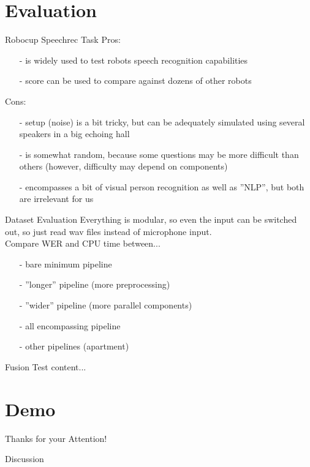 \documentclass{beamer}
\begin{document}
	
	
	
	
	
	
	
	
	\section{Evaluation}
	
	\begin{frame}{Robocup Speechrec Task}
		\pause
		Pros:
		\begin{itemize}
			\item[-] is widely used to test robots speech recognition capabilities
			\item[-] score can be used to compare against dozens of other robots
		\end{itemize}
		\pause
		Cons:
		\begin{itemize}
			\item[-] setup (noise) is a bit tricky, but can be adequately simulated using several speakers in a big echoing hall
			\item[-] is somewhat random, because some questions may be more difficult than others (however, difficulty may depend on components)
			\item[-] encompasses a bit of visual person recognition as well as ''NLP'', but both are irrelevant for us
		\end{itemize}
	\end{frame}
	
	\begin{frame}{Dataset Evaluation}
		Everything is modular, so even the input can be switched out, so just read wav files instead of microphone input.\\

		Compare WER and CPU time between...
		\begin{itemize}
			\item[-] bare minimum pipeline
			\item[-] ''longer'' pipeline (more preprocessing)
			\item[-] ''wider'' pipeline (more parallel components)
			\item[-] all encompassing pipeline
			\item[-] other pipelines (apartment)
		\end{itemize}
	\end{frame}
	
	\begin{frame}{Fusion Test}
		content...
	\end{frame}
	
	
	
	
	
	\section{Demo}
	
	
	
	
	
	\begin{frame}{}
		\begin{alertblock}{Thanks for your Attention!}
		\end{alertblock}
	\end{frame}
	
	\begin{frame}{}
		\begin{alertblock}{Discussion}
		\end{alertblock}
	\end{frame}
	
\end{document}
